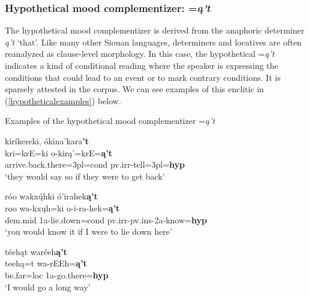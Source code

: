 \subsubsection{Hypothetical mood complementizer: =\textit{ą't}}\label{SecHypothetical}
\largerpage
The hypothetical mood complementizer is derived from the anaphoric determiner \textit{ą't} `that'. Like many other Siouan languages, determiners and locatives are often reanalyzed as clause-level morphology. In this case, the hypothetical =\textit{ą't} indicates a kind of conditional reading where the speaker is expressing the conditions that could lead to an event or to mark contrary conditions. It is sparsely attested in the corpus. We can see examples of this enclitic in (\ref{hypotheticalexamples}) below.

\begin{exe}

\item\label{hypotheticalexamples} Examples of the hypothetical mood complementizer =\textit{ą't}

	\begin{xlist}
	
	\item\label{hypotheticalexamples1}
	\glll kiríkereki, ókina'kara\textbf{'t}\\
	kri=krE=ki o-kirą'=krE=\textbf{ą't}\\
	\textnormal{arrive.back.there}=3pl=cond pv.irr-\textnormal{tell}=3pl=\textbf{hyp}\\
	\glt `they would say so if they were to get back' \citep[20]{kennard1936}

	\item\label{hypotheticalexamples2}
	\glll róo wakxų́hki ó'irahek\textbf{ą't}\\
	roo wa-kxųh=ki o-i-ra-hek=\textbf{ą't}\\
	dem.mid 1a-\textnormal{lie.down}=cond pv.irr-pv.ins-2a-\textnormal{know}=\textbf{hyp}\\
	\glt `you would know it if I were to lie down here' \citep[1]{hollow1973a}

	\item\label{hypotheticalexamples3}
	\glll téehąt waréeh\textbf{ą't}\\
	teehą=t wa-rEEh=\textbf{ą't}\\
	\textnormal{be.far}=loc 1a-\textnormal{go.there}=\textbf{hyp}\\
	\glt `I would go a long way' \citep[146]{hollow1973b}
	

\end{xlist}
\end{exe}
